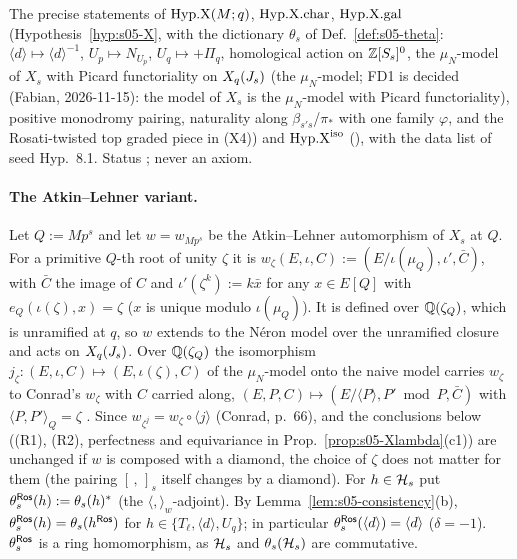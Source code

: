 \begin{interface}\label{if:s05-hypX}
The precise statements of $\mathrm{Hyp.X}(M;q)$, $\mathrm{Hyp.X.char}$, $\mathrm{Hyp.X.gal}$ (Hypothesis~\ref{hyp:s05-X}, with the dictionary $\theta_s$ of
Def.~\ref{def:s05-theta}: $\langle d\rangle\mapsto\langle d\rangle^{-1}$, $U_p\mapsto N_{U_p}$, $U_q\mapsto+\Pi_q$, homological action on
$\mathbb{Z}[S_s]^0$, the $\mu_N$-model of $X_s$ with Picard functoriality on $X_q(J_s)$
(the $\mu_N$-model; FD1 is decided (Fabian, 2026-11-15): the model of $X_s$ is the $\mu_N$-model with Picard functoriality), positive monodromy pairing, naturality along $\beta_{s's}$/$\pi_*$
with one family $\varphi$, and the Rosati-twisted top graded piece in (X4)) and $\mathrm{Hyp.X}^{\mathrm{iso}}$ (), with the data list of
seed Hyp.~8.1. Status \sthyp; never an axiom.
\end{interface}

\paragraph{The Atkin--Lehner variant.}
Let $Q:=Mp^s$ and let $w=w_{Mp^s}$ be the Atkin--Lehner automorphism of $X_s$ at $Q$. For a primitive $Q$-th root of unity $\zeta$ it is
$w_\zeta(E,\iota,C):=(E/\iota(\mu_Q),\iota',\bar C)$, with $\bar C$ the image of $C$ and $\iota'(\zeta^k):=k\bar x$ for any $x\in E[Q]$ with
$e_Q(\iota(\zeta),x)=\zeta$ ($x$ is unique modulo $\iota(\mu_Q)$). It is defined over $\mathbb{Q}(\zeta_Q)$, which is unramified at $q$, so $w$ extends to
the Néron model over the unramified closure and acts on $X_q(J_s)$. Over $\mathbb{Q}(\zeta_Q)$ the isomorphism $j_\zeta:(E,\iota,C)\mapsto(E,\iota(\zeta),C)$
of the $\mu_N$-model onto the naive model carries $w_\zeta$ to Conrad's $w_\zeta$ with $C$ carried along,
$(E,P,C)\mapsto(E/\langle P\rangle,P'\bmod P,\bar C)$ with $\langle P,P'\rangle_Q=\zeta$
. Since $w_{\zeta^j}=w_\zeta\circ\langle j\rangle$ (Conrad, p.~66), and
the conclusions below ((R1), (R2), perfectness and equivariance in Prop.~\ref{prop:s05-Xlambda}(c1)) are unchanged if $w$ is composed with a diamond,
the choice of $\zeta$ does not matter for them (the pairing $[\,,\,]_s$ itself changes by a diamond).
For $h\in\mathcal{H}_s$ put $\theta_s^{\mathsf{Ros}}(h):=\theta_s(h)^*$ (the $\langle,\rangle_w$-adjoint).
 By Lemma~\ref{lem:s05-consistency}(b),
$\theta_s^{\mathsf{Ros}}(h)=\theta_s(h^{\mathsf{Ros}})$ for $h\in\{T_\ell,\langle d\rangle,U_q\}$; in particular $\theta^{\mathsf{Ros}}_s(\langle d\rangle)=\langle d\rangle$ ($\delta=-1$).
$\theta^{\mathsf{Ros}}_s$ is a ring homomorphism, as $\mathcal{H}_s$ and $\theta_s(\mathcal{H}_s)$ are commutative.


